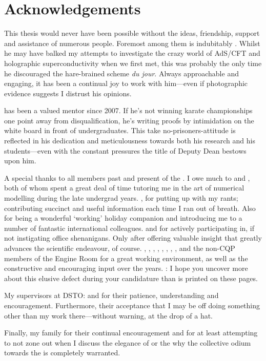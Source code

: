 \chapter{Acknowledgements}

\vspace{-1.2cm}

This thesis would never have been possible without the ideas, friendship, support and assistance of numerous people.
Foremost among them is indubitably .
Whilst he may have balked my attempts to investigate the crazy world of AdS/CFT and holographic superconductivity when we first met, this was probably the only time he discouraged the hare-brained scheme \emph{du jour}.
Always approachable and engaging, it has been a continual joy to work with him---even if photographic evidence suggests I distrust his opinions.

 has been a valued mentor since 2007.
If he's not winning karate championships one point away from disqualification, he's writing proofs by intimidation on the white board in front of undergraduates.
This take no-prisoners-attitude is reflected in his dedication and meticulousness towards both his research and his students---even with the constant pressures the title of Deputy Dean bestows upon him.

A special thanks to all members past and present of the .
I owe much to  and , both of whom spent a great deal of time tutoring me in the art of numerical modelling during the late undergrad years.
, for putting up with my rants; contributing succinct and useful information each time I ran out of breath.
Also for being a wonderful `working' holiday companion and introducing me to a number of fantastic international colleagues.
 and  for actively participating in, if not instigating office shenanigans.
Only after offering valuable insight that greatly advances the scientific endeavour, of course.
, , , , , , , ,  and the non-CQP members of the Engine Room for a great working environment, as well as the constructive and encouraging input over the years.
: I hope you uncover more about this elusive defect during your candidature than is printed on these pages.

My supervisors at DSTO: %
%
 and  for their patience, understanding and encouragement.
Furthermore, their acceptance that I may be off doing something other than my work there---without warning, at the drop of a hat.

Finally, my family for their continual encouragement and for at least attempting to not zone out when I discuss the elegance of  or the why the collective odium towards the  is completely warranted.

